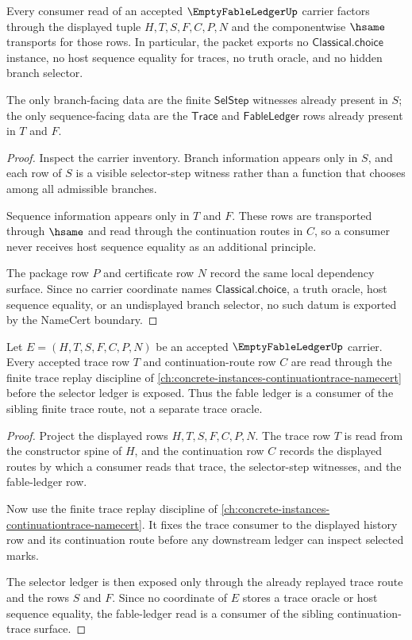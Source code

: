 \begin{theorem}
\label{thm:empty-fable-ledger-non-chooser-boundary}
Every consumer read of an accepted $\EmptyFableLedgerUp$ carrier factors through the displayed tuple $H,T,S,F,C,P,N$ and the componentwise $\hsame$ transports for those rows. In particular, the packet exports no $\mathsf{Classical.choice}$ instance, no host sequence equality for traces, no truth oracle, and no hidden branch selector.

The only branch-facing data are the finite $\mathsf{SelStep}$ witnesses already present in $S$; the only sequence-facing data are the $\mathsf{Trace}$ and $\mathsf{FableLedger}$ rows already present in $T$ and $F$.
\end{theorem}
\begin{proof}
Inspect the carrier inventory. Branch information appears only in $S$, and each row of $S$ is a visible selector-step witness rather than a function that chooses among all admissible branches.

Sequence information appears only in $T$ and $F$. These rows are transported through $\hsame$ and read through the continuation routes in $C$, so a consumer never receives host sequence equality as an additional principle.

The package row $P$ and certificate row $N$ record the same local dependency surface. Since no carrier coordinate names $\mathsf{Classical.choice}$, a truth oracle, host sequence equality, or an undisplayed branch selector, no such datum is exported by the NameCert boundary.
\end{proof}

\begin{theorem}
\label{thm:empty-fable-ledger-continuation-trace-dependency}
Let $E=(H,T,S,F,C,P,N)$ be an accepted $\EmptyFableLedgerUp$ carrier. Every accepted trace row $T$ and continuation-route row $C$ are read through the finite trace replay discipline of \autoref{ch:concrete-instances-continuationtrace-namecert} before the selector ledger is exposed. Thus the fable ledger is a consumer of the sibling finite trace route, not a separate trace oracle.
\end{theorem}
\begin{proof}
Project the displayed rows $H,T,S,F,C,P,N$. The trace row $T$ is read from the constructor spine of $H$, and the continuation row $C$ records the displayed routes by which a consumer reads that trace, the selector-step witnesses, and the fable-ledger row.

Now use the finite trace replay discipline of \autoref{ch:concrete-instances-continuationtrace-namecert}. It fixes the trace consumer to the displayed history row and its continuation route before any downstream ledger can inspect selected marks.

The selector ledger is then exposed only through the already replayed trace route and the rows $S$ and $F$. Since no coordinate of $E$ stores a trace oracle or host sequence equality, the fable-ledger read is a consumer of the sibling continuation-trace surface.
\end{proof}

